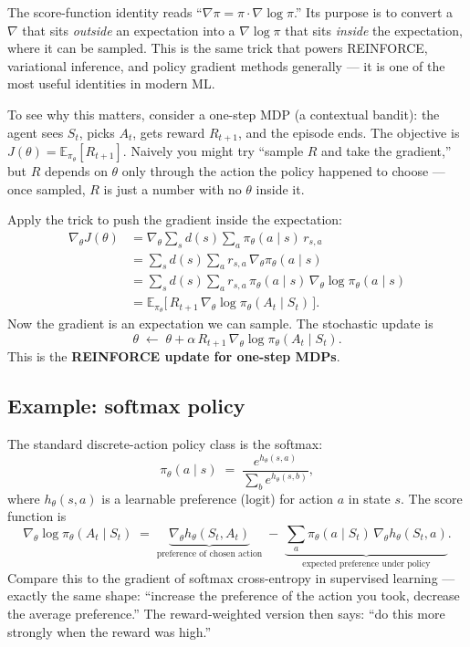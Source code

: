 \documentclass[11pt, oneside]{book}
\newcommand{\E}{\mathbb{E}}              %
\begin{document}
\begin{intbox}
The score-function identity reads ``$\nabla \pi = \pi \cdot \nabla \log \pi$.'' Its
purpose is to convert a $\nabla$ that sits \emph{outside} an expectation into a
$\nabla \log \pi$ that sits \emph{inside} the expectation, where it can be sampled.
This is the same trick that powers REINFORCE, variational inference, and policy
gradient methods generally --- it is one of the most useful identities in modern
ML.
\end{intbox}

To see why this matters, consider a one-step MDP (a contextual bandit): the agent
sees $S_t$, picks $A_t$, gets reward $R_{t+1}$, and the episode ends.
The objective is $J(\theta) = \E_{\pi_\theta}[R_{t+1}]$.
Naively you might try ``sample $R$ and take the gradient,'' but $R$ depends on
$\theta$ only through the action the policy happened to choose --- once sampled, $R$
is just a number with no $\theta$ inside it.

Apply the trick to push the gradient inside the expectation:
\begin{align*}
  \nabla_\theta J(\theta)
  &= \nabla_\theta \sum_s d(s) \sum_a \pi_\theta(a \mid s)\, r_{s,a} \\
  &= \sum_s d(s) \sum_a r_{s,a}\, \nabla_\theta \pi_\theta(a \mid s) \\
  &= \sum_s d(s) \sum_a r_{s,a}\, \pi_\theta(a \mid s)\, \nabla_\theta \log \pi_\theta(a \mid s) \\
  &= \E_{\pi_\theta}\!\bigl[\, R_{t+1}\, \nabla_\theta \log \pi_\theta(A_t \mid S_t)\, \bigr].
\end{align*}
Now the gradient is an expectation we can sample.
The stochastic update is
\[
  \theta \;\leftarrow\; \theta + \alpha\, R_{t+1}\, \nabla_\theta \log \pi_\theta(A_t \mid S_t).
\]
This is the \textbf{REINFORCE update for one-step MDPs}.

\subsection{Example: softmax policy}

The standard discrete-action policy class is the softmax:
\[
  \pi_\theta(a \mid s) \;=\; \frac{e^{h_\theta(s,a)}}{\sum_b e^{h_\theta(s,b)}},
\]
where $h_\theta(s,a)$ is a learnable preference (logit) for action $a$ in state $s$.
The score function is
\[
  \nabla_\theta \log \pi_\theta(A_t \mid S_t)
  \;=\; \underbrace{\nabla_\theta h_\theta(S_t, A_t)}_{\text{preference of chosen action}}
       \;-\; \underbrace{\sum_a \pi_\theta(a \mid S_t)\, \nabla_\theta h_\theta(S_t, a)}_{\text{expected preference under policy}}.
\]
Compare this to the gradient of softmax cross-entropy in supervised learning ---
exactly the same shape: ``increase the preference of the action you took, decrease
the average preference.''
The reward-weighted version then says: ``do this more strongly when the reward was high.''
\end{document}
